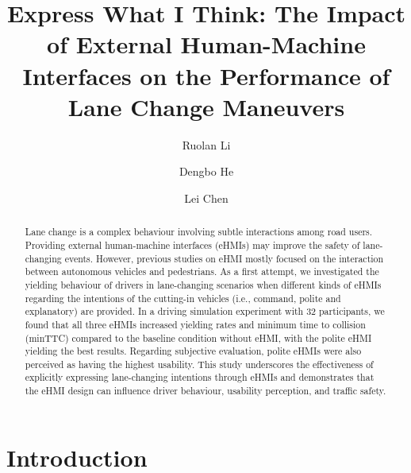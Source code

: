 \documentclass[manuscript,review]{acmart}
\begin{document}
\title{Express What I Think: The Impact of External Human-Machine Interfaces on the Performance of Lane Change Maneuvers}

\author{Ruolan Li}

\author{Dengbo He}

\author{Lei Chen}

\renewcommand{\shortauthors}{Li et al.}

\begin{abstract}
Lane change is a complex behaviour involving subtle interactions among road users. Providing external human-machine interfaces (eHMIs) may improve the safety of lane-changing events. However, previous studies on eHMI mostly focused on the interaction between autonomous vehicles and pedestrians. As a first attempt, we investigated the yielding behaviour of drivers in lane-changing scenarios when different kinds of eHMIs regarding the intentions of the cutting-in vehicles (i.e., command, polite and explanatory) are provided. In a driving simulation experiment with 32 participants, we found that all three eHMIs increased yielding rates and minimum time to collision (minTTC) compared to the baseline condition without eHMI, with the polite eHMI yielding the best results. Regarding subjective evaluation, polite eHMIs were also perceived as having the highest usability. This study underscores the effectiveness of explicitly expressing lane-changing intentions through eHMIs and demonstrates that the eHMI design can influence driver behaviour, usability perception, and traffic safety.
\end{abstract}

\maketitle

\section{Introduction}
\end{document}
